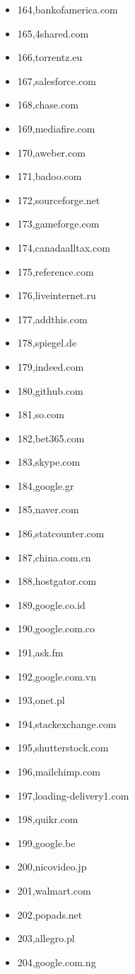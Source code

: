 \begin{multicols}{3}
\begin{itemize}
	\item 164,bankofamerica.com
	\item 165,4shared.com
	\item 166,torrentz.eu
	\item 167,salesforce.com
	\item 168,chase.com
	\item 169,mediafire.com
	\item 170,aweber.com
	\item 171,badoo.com
	\item 172,sourceforge.net
	\item 173,gameforge.com
	\item 174,canadaalltax.com
	\item 175,reference.com
	\item 176,liveinternet.ru
	\item 177,addthis.com
	\item 178,spiegel.de
	\item 179,indeed.com
	\item 180,github.com
	\item 181,so.com
	\item 182,bet365.com
	\item 183,skype.com
	\item 184,google.gr
	\item 185,naver.com
	\item 186,statcounter.com
	\item 187,china.com.cn
	\item 188,hostgator.com
	\item 189,google.co.id
	\item 190,google.com.co
	\item 191,ask.fm
	\item 192,google.com.vn
	\item 193,onet.pl
	\item 194,stackexchange.com
	\item 195,shutterstock.com
	\item 196,mailchimp.com
	\item 197,loading-delivery1.com
	\item 198,quikr.com
	\item 199,google.be
	\item 200,nicovideo.jp
	\item 201,walmart.com
	\item 202,popads.net
	\item 203,allegro.pl
	\item 204,google.com.ng

\end{itemize}
\end{multicols}

